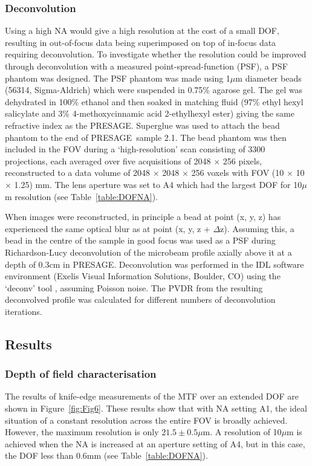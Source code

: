 \documentclass[12pt]{article}
\begin{document}
\subsubsection{Deconvolution}
Using a high NA would give a high resolution at the cost of a small DOF, resulting in out-of-focus data being superimposed on top of in-focus data requiring deconvolution. To investigate whether the resolution could be improved through deconvolution with a measured point-spread-function (PSF), a PSF phantom was designed. The PSF phantom was made using 1$\mu$m diameter beads (56314, Sigma-Aldrich) which were suspended in 0.75\% agarose gel. The gel was dehydrated in 100\% ethanol and then soaked in matching fluid (97\% ethyl hexyl salicylate and 3\% 4-methoxycinnamic acid 2-ethylhexyl ester) giving the same refractive index as the PRESAGE\textregistered. Superglue was used to attach the bead phantom to the end of PRESAGE\textregistered \ sample 2.1. The bead phantom was then included in the FOV during a `high-resolution' scan consisting of 3300 projections, each averaged over five acquisitions of 2048 $\times$ 256 pixels, reconstructed to a data volume of 2048 $\times$ 2048 $\times$ 256 voxels with FOV (10 $\times$ 10 $\times$ 1.25) mm. The lens aperture was set to A4  which had the largest DOF for 10$\mu$m resolution (see Table~\ref{table:DOFNA}). 

When images were reconstructed, in principle a bead at point (x, y, z) has experienced the same optical blur as at point (x, y, z + $\Delta $z). Assuming this, a bead in the centre of the sample in good focus was used as a PSF during Richardson-Lucy deconvolution of the microbeam profile axially above it at a depth of 0.3cm in PRESAGE\textregistered. Deconvolution was performed in the IDL software environment (Exelis Visual Information Solutions, Boulder, CO) using the `deconv' tool \cite{varosi1993idl}, assuming Poisson noise. The PVDR from the resulting deconvolved profile was calculated for different numbers of deconvolution iterations.

\subsection{Results}
\subsubsection{Depth of field characterisation}
The results of knife-edge measurements of the MTF over an extended DOF are shown in Figure~\ref{fig:Fig6}. These results show that with NA setting A1, the ideal situation of a constant resolution across the entire FOV is broadly achieved. However, the maximum resolution is only $21.5 \pm 0.5\mu$m. A resolution of 10$\mu$m is achieved when the NA is increased at an aperture setting of A4, but in this case, the DOF less than 0.6mm (see Table~\ref{table:DOFNA}).
\end{document}
